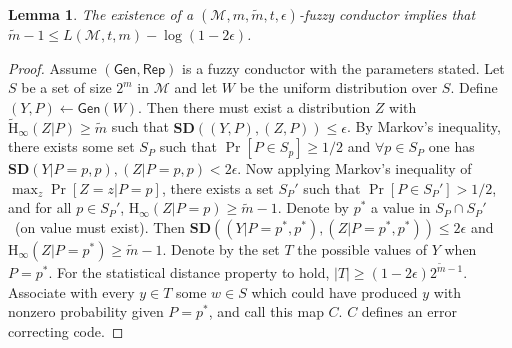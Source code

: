 \documentclass[11pt]{article}
\newcommand{\lemref}[1]{\mbox{Lemma~\ref{#1}}}
\newcommand{\class}[1]{{\ensuremath{\mathsf{#1}}}}
\newcommand{\gen}{\ensuremath{\class{Gen}}\xspace}
\newcommand{\rep}{\ensuremath{\class{Rep}}\xspace}
\newcommand{\Hoo}{\mathrm{H}_\infty}
\newcommand{\Hav}{\tilde{\mathrm{H}}_\infty}
\newtheorem{lemma}[theorem]{Lemma}
\begin{document}
\begin{lemma}
The existence of a $(\mathcal{M}, m, \tilde{m}, t, \epsilon)$-fuzzy conductor implies that $\tilde{m}-1\leq L(\mathcal{M}, t, m) -\log (1-2\epsilon)$.
\end{lemma}
\begin{proof}  Assume $(\gen, \rep)$ is a fuzzy conductor with the parameters stated.  Let $S$ be a set of size $2^m$ in $\mathcal{M}$ and let $W$ be the uniform distribution over $S$.  Define $(Y, P) \leftarrow \gen(W)$.  Then there must exist a distribution $Z$ with $\Hav(Z|P) \geq \tilde{m}$ such that $\mathbf{SD}((Y, P), (Z, P))\leq \epsilon$.  By Markov's inequality, there exists some set $S_P$ such that $\Pr[P\in S_p] \geq 1/2$ and $\forall p\in S_P$ one has $\mathbf{SD}(Y | P = p, p ), (Z | P = p, p)<2\epsilon$.  Now applying Markov's inequality of $\max_{z} \Pr[Z=z | P=p]$, there exists a set $S_P'$ such that $\Pr[P\in S_P']>1/2$, and for all $p\in S_P'$, $\Hoo(Z| P =p ) \geq \tilde{m}-1$.  Denote by $p^*$ a value in $S_P\cap S_P'$~(on value must exist).  Then $\mathbf{SD}((Y | P =p^* , p^*), (Z| P = p^*, p^*))\leq 2\epsilon$ and $\Hoo(Z|P=p^*)\geq \tilde{m}-1$.  Denote by the set $T$ the possible values of $Y$ when $P=p^*$.  For the statistical distance property to hold, $|T| \geq  (1-2\epsilon)2^{\tilde{m}-1}$.  Associate with every $y\in T$ some $w\in S$ which could have produced $y$ with nonzero probability given $P=p^*$, and call this map $C$.  $C$ defines an error correcting code.

\end{proof}


\end{document}

